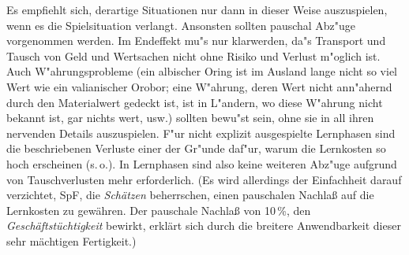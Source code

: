 \documentclass[10pt,a4paper,germanpar]{article}
\begin{document}

Es empfiehlt sich, derartige Situationen nur dann in dieser Weise
auszuspielen, wenn es die Spielsituation verlangt. Ansonsten sollten
pauschal Abz"uge vorgenommen werden. Im Endeffekt mu"s nur klarwerden,
da"s Transport und Tausch von Geld und Wertsachen nicht ohne Risiko
und Verlust m"oglich ist. Auch W"ahrungsprobleme (ein albischer Oring
ist im Ausland lange nicht so viel Wert wie ein valianischer Orobor;
eine W"ahrung, deren Wert nicht ann"ahernd durch den Materialwert
gedeckt ist, ist in L"andern, wo diese W"ahrung nicht bekannt ist, gar
nichts wert, usw.) sollten bewu"st sein, ohne sie in all ihren
nervenden Details auszuspielen. F"ur nicht explizit ausgespielte
Lernphasen sind die beschriebenen Verluste einer der Gr"unde daf"ur,
warum die Lernkosten so hoch erscheinen (s.\,o.). In Lernphasen sind
also keine weiteren Abz"uge aufgrund von Tauschverlusten mehr
erforderlich. (Es wird allerdings der Einfachheit darauf verzichtet,
SpF, die \emph{Schätzen} beherrschen, einen pauschalen Nachlaß auf die
Lernkosten zu gewähren. Der pauschale Nachlaß von 10\,\%, den
\emph{Geschäftstüchtigkeit} bewirkt, erklärt sich durch die breitere
Anwendbarkeit dieser sehr mächtigen Fertigkeit.)
\end{document}
